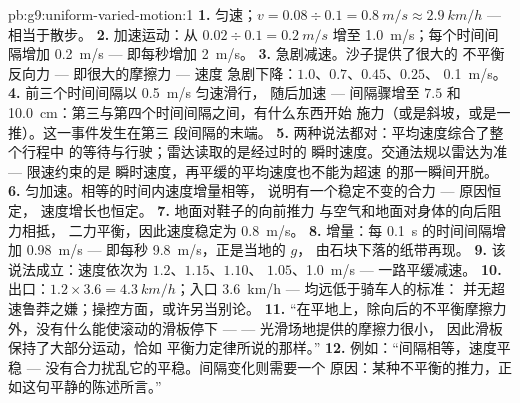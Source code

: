 \begin{solution}{pb:g9:uniform-varied-motion:1}
\textbf{1.} 匀速；$v = 0.08 \div 0.1 = \qty{0.8}{m/s}
\approx \qty{2.9}{km/h}$ --- 相当于散步。
\textbf{2.} 加速运动：从 $0.02 \div 0.1 = \qty{0.2}{m/s}$
增至 \qty{1.0}{m/s}；每个时间间隔增加 \qty{0.2}{m/s} ---
即每秒增加 \qty{2}{m/s}。
\textbf{3.} 急剧减速。沙子提供了很大的
不平衡反向力 --- 即很大的摩擦力 --- 速度
急剧下降：$1.0$、$0.7$、$0.45$、$0.25$、
\qty{0.1}{m/s}。
\textbf{4.} 前三个时间间隔以 \qty{0.5}{m/s} 匀速滑行，
随后加速 --- 间隔骤增至 $7.5$ 和
\qty{10.0}{cm}：第三与第四个时间间隔之间，有什么东西开始
施力（或是斜坡，或是一推）。这一事件发生在第三
段间隔的末端。
\textbf{5.} 两种说法都对：平均速度综合了整个行程中
的等待与行驶；雷达读取的是经过时的
瞬时速度。交通法规以雷达为准 --- 限速约束的是
瞬时速度，再平缓的平均速度也不能为超速
的那一瞬间开脱。
\textbf{6.} 匀加速。相等的时间内速度增量相等，
说明有一个稳定不变的合力 --- 原因恒定，
速度增长也恒定。
\textbf{7.} 地面对鞋子的向前推力
与空气和地面对身体的向后阻力相抵，
二力平衡，因此速度稳定为 \qty{0.8}{m/s}。
\textbf{8.} 增量：每 \qty{0.1}{s} 的时间间隔增加 \qty{0.98}{m/s}
--- 即每秒 \qty{9.8}{m/s}，正是当地的 $g$，
由石块下落的纸带再现。
\textbf{9.} 该说法成立：速度依次为 $1.2$、$1.15$、$1.10$、
$1.05$、\qty{1.0}{m/s} --- 一路平缓减速。
\textbf{10.} 出口：$1.2 \times 3.6 = \qty{4.3}{km/h}$；入口
\qty{3.6}{km/h} --- 均远低于骑车人的标准：
并无超速鲁莽之嫌；操控方面，或许另当别论。
\textbf{11.} “在平地上，除向后的不平衡摩擦力外，没有什么能使滚动的滑板停下 ---
--- 光滑场地提供的摩擦力很小，
因此滑板保持了大部分运动，恰如
平衡力定律所说的那样。”
\textbf{12.} 例如：“间隔相等，速度平稳 ---
没有合力扰乱它的平稳。间隔变化则需要一个
原因：某种不平衡的推力，正如这句平静的陈述所言。”
\end{solution}
